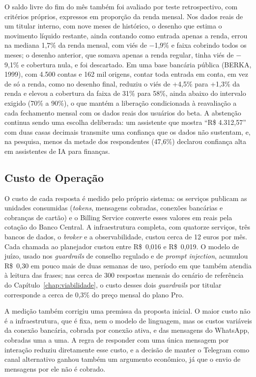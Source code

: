 O saldo livre do fim do mês também foi avaliado por teste retrospectivo, com critérios próprios, expressos em proporção da renda mensal. Nos dados reais de um titular interno, com nove meses de histórico, o desenho que estima o movimento líquido restante, ainda contando como entrada apenas a renda, errou na mediana 1,7\% da renda mensal, com viés de $-$1,9\% e faixa cobrindo todos os meses; o desenho anterior, que somava apenas a renda regular, tinha viés de $-$9,1\% e cobertura nula, e foi descartado. Em uma base bancária pública (BERKA, 1999), com 4.500 contas e 162 mil origens, contar toda entrada em conta, em vez de só a renda, como no desenho final, reduziu o viés de +4,5\% para +1,3\% da renda e elevou a cobertura da faixa de 31\% para 58\%, ainda abaixo do intervalo exigido (70\% a 90\%), o que mantém a liberação condicionada à reavaliação a cada fechamento mensal com os dados reais dos usuários do beta. A abstenção continua sendo uma escolha deliberada: um assistente que mostra ``R\$ 4.312,57'' com duas casas decimais transmite uma confiança que os dados não sustentam, e, na pesquisa, menos da metade dos respondentes (47,6\%) declarou confiança alta em assistentes de IA para finanças.

\subsection{Custo de Operação}

O custo de cada resposta é medido pelo próprio sistema: os serviços publicam as unidades consumidas (\textit{tokens}, mensagens cobradas, conexões bancárias e cobranças de cartão) e o Billing Service converte esses valores em reais pela cotação do Banco Central. A infraestrutura completa, com quatorze serviços, três bancos de dados, o \textit{broker} e a observabilidade, custou cerca de 12 euros por mês. Cada chamada ao planejador custou entre R\$~0,016 e R\$~0,019. O modelo de juízo, usado nos \textit{guardrails} de conselho regulado e de \textit{prompt injection}, acumulou R\$~0,30 em pouco mais de duas semanas de uso, período em que também atendia à leitura das frases; nas cerca de 300 respostas mensais do cenário de referência do Capítulo~\ref{chap:viabilidade}, o custo desses dois \textit{guardrails} por titular corresponde a cerca de 0,3\% do preço mensal do plano Pro.

A medição também corrigiu uma premissa da proposta inicial. O maior custo não é a infraestrutura, que é fixa, nem o modelo de linguagem, mas os custos variáveis da conexão bancária, cobrada por conexão ativa, e das mensagens do WhatsApp, cobradas uma a uma. A regra de responder com uma única mensagem por interação reduziu diretamente esse custo, e a decisão de manter o Telegram como canal alternativo ganhou também um argumento econômico, já que o envio de mensagens por ele não é cobrado.

